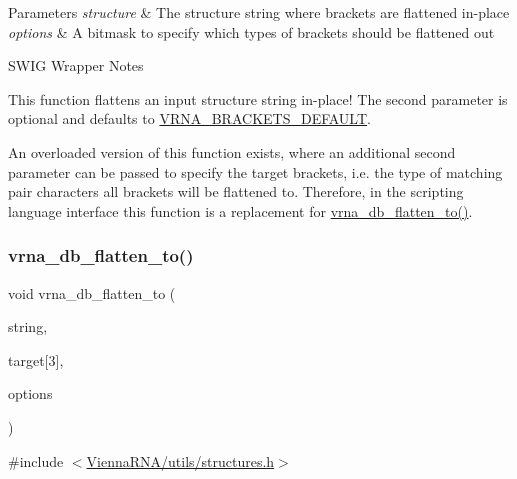 \begin{DoxyParams}{Parameters}
{\em structure} & The structure string where brackets are flattened in-\/place \\
\hline
{\em options} & A bitmask to specify which types of brackets should be flattened out\\
\hline
\end{DoxyParams}
\begin{DoxyRefDesc}{S\+W\+I\+G Wrapper Notes}
\item[\mbox{\hyperlink{wrappers__wrappers000127}{S\+W\+I\+G Wrapper Notes}}]This function flattens an input structure string in-\/place! The second parameter is optional and defaults to \mbox{\hyperlink{group__struct__utils__dot__bracket_ga559ebf76b1b289f85309f4206e99aa1a}{V\+R\+N\+A\+\_\+\+B\+R\+A\+C\+K\+E\+T\+S\+\_\+\+D\+E\+F\+A\+U\+LT}}.

An overloaded version of this function exists, where an additional second parameter can be passed to specify the target brackets, i.\+e. the type of matching pair characters all brackets will be flattened to. Therefore, in the scripting language interface this function is a replacement for \mbox{\hyperlink{group__struct__utils__dot__bracket_ga690425199c8b71545e7196e3af1436f8}{vrna\+\_\+db\+\_\+flatten\+\_\+to()}}. \end{DoxyRefDesc}
\mbox{\label{group__struct__utils__dot__bracket_ga690425199c8b71545e7196e3af1436f8}} 
\subsubsection{\texorpdfstring{vrna\_db\_flatten\_to()}{vrna\_db\_flatten\_to()}}
{\footnotesize\ttfamily void vrna\+\_\+db\+\_\+flatten\+\_\+to (\begin{DoxyParamCaption}\item[{char $\ast$}]{string,  }\item[{const char}]{target\mbox{[}3\mbox{]},  }\item[{unsigned int}]{options }\end{DoxyParamCaption})}



{\ttfamily \#include $<$\mbox{\hyperlink{utils_2structures_8h}{Vienna\+R\+N\+A/utils/structures.\+h}}$>$}



